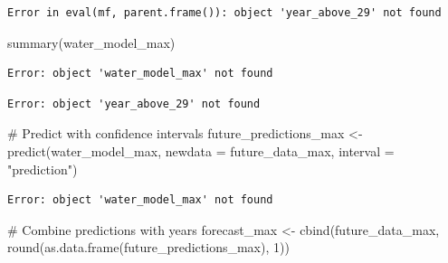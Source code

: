 \documentclass[
  letterpaper,
  DIV=11,
  numbers=noendperiod]{scrreprt}
\newenvironment{Shaded}{\begin{snugshade}}{\end{snugshade}}
\newcommand{\AttributeTok}[1]{\textcolor[rgb]{0.40,0.45,0.13}{#1}}
\newcommand{\CommentTok}[1]{\textcolor[rgb]{0.37,0.37,0.37}{#1}}
\newcommand{\DecValTok}[1]{\textcolor[rgb]{0.68,0.00,0.00}{#1}}
\newcommand{\FunctionTok}[1]{\textcolor[rgb]{0.28,0.35,0.67}{#1}}
\newcommand{\NormalTok}[1]{\textcolor[rgb]{0.00,0.23,0.31}{#1}}
\newcommand{\OtherTok}[1]{\textcolor[rgb]{0.00,0.23,0.31}{#1}}
\newcommand{\SpecialCharTok}[1]{\textcolor[rgb]{0.37,0.37,0.37}{#1}}
\newcommand{\StringTok}[1]{\textcolor[rgb]{0.13,0.47,0.30}{#1}}
\begin{document}
\begin{verbatim}
Error in eval(mf, parent.frame()): object 'year_above_29' not found
\end{verbatim}

\begin{Shaded}
\begin{Highlighting}[]
\FunctionTok{summary}\NormalTok{(water\_model\_max)  }
\end{Highlighting}
\end{Shaded}

\begin{verbatim}
Error: object 'water_model_max' not found
\end{verbatim}

\begin{Shaded}
\end{Shaded}

\begin{verbatim}
Error: object 'year_above_29' not found
\end{verbatim}

\begin{Shaded}
\begin{Highlighting}[]
\CommentTok{\# Predict with confidence intervals}
\NormalTok{future\_predictions\_max }\OtherTok{\textless{}{-}} \FunctionTok{predict}\NormalTok{(water\_model\_max, }\AttributeTok{newdata =}\NormalTok{ future\_data\_max, }\AttributeTok{interval =} \StringTok{"prediction"}\NormalTok{)}
\end{Highlighting}
\end{Shaded}

\begin{verbatim}
Error: object 'water_model_max' not found
\end{verbatim}

\begin{Shaded}
\begin{Highlighting}[]
\CommentTok{\# Combine predictions with years}
\NormalTok{forecast\_max }\OtherTok{\textless{}{-}} \FunctionTok{cbind}\NormalTok{(future\_data\_max, }\FunctionTok{round}\NormalTok{(}\FunctionTok{as.data.frame}\NormalTok{(future\_predictions\_max), }\DecValTok{1}\NormalTok{))}
\end{Highlighting}
\end{Shaded}
\end{document}
